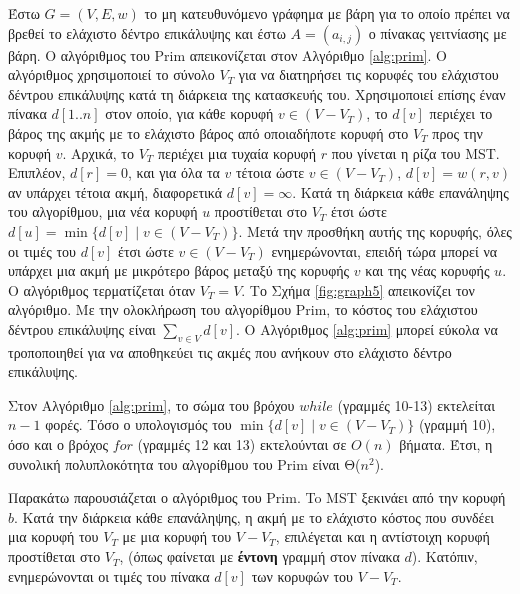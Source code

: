 \documentclass[12pt,a4paper]{article} %
\begin{document}
Έστω $G = (V, E, w)$ το μη κατευθυνόμενο γράφημα με βάρη για το οποίο πρέπει να βρεθεί το ελάχιστο δέντρο επικάλυψης και έστω $A = (a_{i, j})$ ο πίνακας γειτνίασης με βάρη. O αλγόριθμος του Prim απεικονίζεται στον Αλγόριθμο \ref{alg:prim}. Ο αλγόριθμος χρησιμοποιεί το σύνολο $V_T$ για να διατηρήσει τις κορυφές του ελάχιστου δέντρου επικάλυψης κατά τη διάρκεια της κατασκευής του. Χρησιμοποιεί επίσης έναν πίνακα $d[1..n]$ στον οποίο, για κάθε κορυφή $v \in (V - V_T)$, το $d[v]$ περιέχει το βάρος της ακμής με το ελάχιστο βάρος από οποιαδήποτε κορυφή στο $V_T$ προς την κορυφή $v$. Αρχικά, το $V_T$ περιέχει μια τυχαία κορυφή $r$ που γίνεται η ρίζα του MST. Επιπλέον, $d[r] = 0$, και για όλα τα $v$ τέτοια ώστε $v \in (V - V_T)$, $d[v] = w(r, v)$ αν υπάρχει τέτοια ακμή, διαφορετικά $d[v] = \infty$. Κατά τη διάρκεια κάθε επανάληψης του αλγορίθμου, μια νέα κορυφή $u$ προστίθεται στο $V_T$ έτσι ώστε $d[u] = \min\{d[v] \mid v \in (V - V_T)\}$. Μετά την προσθήκη αυτής της κορυφής, όλες οι τιμές του $d[v]$ έτσι ώστε $v \in (V - V_T)$ ενημερώνονται, επειδή τώρα μπορεί να υπάρχει μια ακμή με μικρότερο βάρος μεταξύ της κορυφής $v$ και της νέας κορυφής $u$. Ο αλγόριθμος τερματίζεται όταν $V_T = V$. Το Σχήμα \ref{fig:graph5} απεικονίζει τον αλγόριθμο. Με την ολοκλήρωση του αλγορίθμου Prim, το κόστος του ελάχιστου δέντρου επικάλυψης είναι $\sum_{v \in V} d[v]$. Ο Αλγόριθμος \ref{alg:prim} μπορεί εύκολα να τροποποιηθεί για να αποθηκεύει τις ακμές που ανήκουν στο ελάχιστο δέντρο επικάλυψης.

\vspace{0.3cm}



Στον Αλγόριθμο \ref{alg:prim}, το σώμα του βρόχου $while$ (γραμμές 10-13) εκτελείται $n-1$ φορές. Τόσο ο υπολογισμός του $\min \{ d[v] \mid v \in (V - V_T) \}$
(γραμμή 10), όσο και ο βρόχος $for$ (γραμμές 12 και 13) εκτελούνται σε $O(n)$ βήματα. Έτσι, η συνολική πολυπλοκότητα του αλγορίθμου του Prim είναι Θ($n^2$). 

\vspace{0.3cm}
Παρακάτω παρουσιάζεται ο αλγόριθμος του Prim. To MST ξεκινάει από την κορυφή $b$. Κατά την διάρκεια κάθε επανάληψης, η ακμή με το ελάχιστο κόστος που συνδέει μια κορυφή του $V_T$ με μια κορυφή του $V - V_T$, επιλέγεται και η αντίστοιχη κορυφή προστίθεται στο $V_T$, (όπως φαίνεται με \textbf{έντονη} γραμμή στον πίνακα $d$). Κατόπιν, ενημερώνονται οι τιμές του πίνακα $d[v]$ των κορυφών του $V - V_T$.
\end{document}
